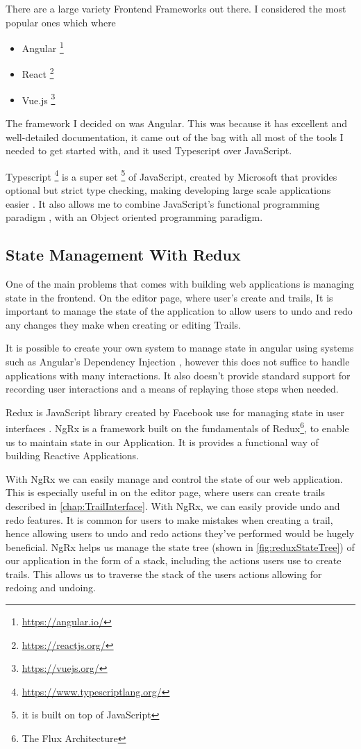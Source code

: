 There are a large variety Frontend Frameworks out there. I considered the most popular ones which where
\begin{itemize}
    \item Angular \footnote{\url{https://angular.io/}}
    \item React \footnote{\url{https://reactjs.org/}}
    \item Vue.js \footnote{\url{https://vuejs.org/}}
\end{itemize}

The framework I decided on was Angular. This was because it has excellent and well-detailed documentation, it came out of the bag with all most of the tools I needed to get started with, and it used Typescript over JavaScript.

Typescript \footnote{\url{https://www.typescriptlang.org/}} is a super set \footnote{it is built on top of JavaScript} of JavaScript, created by Microsoft that provides optional but strict type checking, making developing large scale applications easier \cite{bierman2014understanding}. It also allows me to combine JavaScript's functional programming paradigm \cite{hughes1989functional}, with an Object oriented programming paradigm.

\subsection{State Management With Redux}
One of the main problems that comes with building web applications is managing state in the frontend. On the editor page, where user's create and trails, It is important to manage the state of the application to allow users to undo and redo any changes they make when creating or editing Trails.

It is possible to create your own system to manage state in angular using systems such as Angular's Dependency Injection \cite{wiki:DependencyInjection}, however this does not suffice to handle applications with many interactions. It also doesn't provide standard support for recording user interactions and a means of replaying those steps when needed.

Redux is JavaScript library created by Facebook use for managing state in user interfaces \cite{wiki:Redux}. NgRx \cite{cheng2018state} is a framework built on the fundamentals of Redux\footnote{The Flux Architecture}, to enable us to maintain state in our Application. It is provides a functional way of building Reactive Applications.

With NgRx we can easily manage and control the state of our web application. This is especially useful in on the editor page, where users can create trails described in \autoref{chap:TrailInterface}. With NgRx, we can easily provide undo and redo features. It is common for users to make mistakes when creating a trail, hence allowing users to undo and redo actions they've performed would be hugely beneficial. NgRx helps us manage the state tree (shown in \autoref{fig:reduxStateTree}) of our application in the form of a stack, including the actions users use to create trails. This allows us to traverse the stack of the users actions allowing for redoing and undoing.


